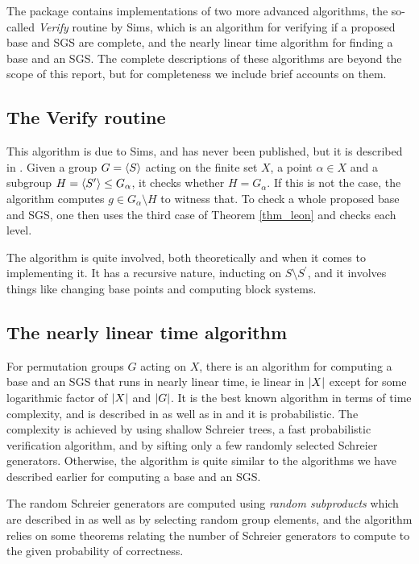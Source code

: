 The package contains implementations of two more advanced algorithms,
the so-called \emph{Verify} routine by Sims, which is an algorithm for
verifying if a proposed base and SGS are complete, and the nearly
linear time algorithm for finding a base and an SGS. The complete
descriptions of these algorithms are beyond the scope of this report,
but for completeness we include brief accounts on them.

\subsection{The Verify routine}

This algorithm is due to Sims, and has never been published, but it is
described in \cite{seress03}. Given a group $G = \left\langle S \right\rangle$ acting on
the finite set $X$, a point $\alpha \in X$ and a subgroup $H = \left\langle S^{\prime} \right\rangle \leq G_{\alpha}$, it
checks whether $H = G_{\alpha}$. If this is not the case, the
algorithm computes $g \in G_{\alpha} \setminus H$ to witness that. To
check a whole proposed base and SGS, one then uses the third case of
Theorem \ref{thm_leon} and checks each level.

The algorithm is quite involved, both theoretically and when it comes
to implementing it. It has a recursive nature, inducting on $S \setminus
S^{\prime}$, and it involves things like changing base points and
computing block systems.

\subsection{The nearly linear time algorithm}
For permutation groups $G$ acting on $X$, there is an algorithm for
computing a base and an SGS that runs in nearly linear time, ie linear
in $\left\lvert X \right\rvert$ except for some logarithmic factor of $\left\lvert X \right\rvert$ and
$\left\lvert G \right\rvert$. It is the best known algorithm in terms of time complexity,
and is described in \cite{seress91} as well as in \cite{seress03} and it
is probabilistic. The complexity is achieved by using shallow
Schreier trees, a fast probabilistic verification algorithm, and by
sifting only a few randomly selected Schreier generators. Otherwise,
the algorithm is quite similar to the algorithms we have described
earlier for computing a base and an SGS.

The random Schreier generators are computed using \emph{random
  subproducts} which are described in \cite{seress03} as well as by
selecting random group elements, and the algorithm relies on some
theorems relating the number of Schreier generators to compute to the
given probability of correctness.

